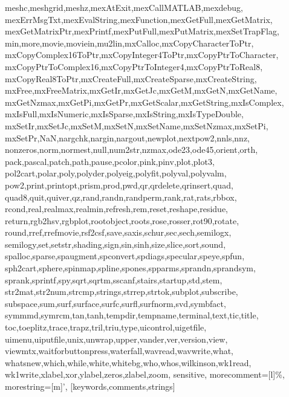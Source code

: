 {{            meshc,meshgrid,meshz,mexAtExit,mexCallMATLAB,mexdebug,%
            mexErrMsgTxt,mexEvalString,mexFunction,mexGetFull,mexGetMatrix,%
            mexGetMatrixPtr,mexPrintf,mexPutFull,mexPutMatrix,mexSetTrapFlag,%
            min,more,movie,moviein,mu2lin,mxCalloc,mxCopyCharacterToPtr,%
            mxCopyComplex16ToPtr,mxCopyInteger4ToPtr,mxCopyPtrToCharacter,%
            mxCopyPtrToComplex16,mxCopyPtrToInteger4,mxCopyPtrToReal8,%
            mxCopyReal8ToPtr,mxCreateFull,mxCreateSparse,mxCreateString,%
            mxFree,mxFreeMatrix,mxGetIr,mxGetJc,mxGetM,mxGetN,mxGetName,%
            mxGetNzmax,mxGetPi,mxGetPr,mxGetScalar,mxGetString,mxIsComplex,%
            mxIsFull,mxIsNumeric,mxIsSparse,mxIsString,mxIsTypeDouble,%
            mxSetIr,mxSetJc,mxSetM,mxSetN,mxSetName,mxSetNzmax,mxSetPi,%
            mxSetPr,NaN,nargchk,nargin,nargout,newplot,nextpow2,nnls,nnz,%
            nonzeros,norm,normest,null,num2str,nzmax,ode23,ode45,orient,orth,%
            pack,pascal,patch,path,pause,pcolor,pink,pinv,plot,plot3,%
            pol2cart,polar,poly,polyder,polyeig,polyfit,polyval,polyvalm,%
            pow2,print,printopt,prism,prod,pwd,qr,qrdelete,qrinsert,quad,%
            quad8,quit,quiver,qz,rand,randn,randperm,rank,rat,rats,rbbox,%
            rcond,real,realmax,realmin,refresh,rem,reset,reshape,residue,%
            return,rgb2hsv,rgbplot,rootobject,roots,rose,rosser,rot90,rotate,%
            round,rref,rrefmovie,rsf2csf,save,saxis,schur,sec,sech,semilogx,%
            semilogy,set,setstr,shading,sign,sin,sinh,size,slice,sort,sound,%
            spalloc,sparse,spaugment,spconvert,spdiags,specular,speye,spfun,%
            sph2cart,sphere,spinmap,spline,spones,spparms,sprandn,sprandsym,%
            sprank,sprintf,spy,sqrt,sqrtm,sscanf,stairs,startup,std,stem,%
            str2mat,str2num,strcmp,strings,strrep,strtok,subplot,subscribe,%
            subspace,sum,surf,surface,surfc,surfl,surfnorm,svd,symbfact,%
            symmmd,symrcm,tan,tanh,tempdir,tempname,terminal,text,tic,title,%
            toc,toeplitz,trace,trapz,tril,triu,type,uicontrol,uigetfile,%
            uimenu,uiputfile,unix,unwrap,upper,vander,ver,version,view,%
            viewmtx,waitforbuttonpress,waterfall,wavread,wavwrite,what,%
            whatsnew,which,while,white,whitebg,who,whos,wilkinson,wk1read,%
            wk1write,xlabel,xor,ylabel,zeros,zlabel,zoom},%
    sensitive,%
    morecomment=[l]\%,%
    morestring=[m]',%
    }[keywords,comments,strings]%





